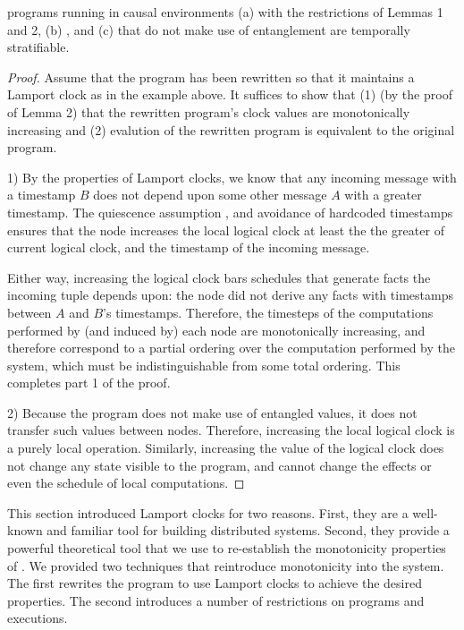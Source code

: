 \begin{lemma}
\lang programs running in causal environments (a) with the restrictions of
Lemmas 1 and 2, (b) , and (c) that do not make use of entanglement are temporally
stratifiable.
\begin{proof}
Assume that the program has been rewritten
so that it maintains a Lamport clock as in the example above.  It
suffices to show that (1) (by the proof of Lemma 2) that the rewritten
program's clock values are monotonically increasing and (2) evalution
of the rewritten program is equivalent to the original program.

1) By the properties of Lamport clocks, we know that any incoming
message with a timestamp $B$ does not depend upon some other message
$A$ with a greater timestamp.  The quiescence assumption , and avoidance of hardcoded timestamps ensures
that the node increases the local logical clock at least the the
greater of current logical clock, and the timestamp of the incoming
message.

Either way, increasing the logical clock bars schedules that generate
facts the incoming tuple depends upon: the node did not derive any
facts with timestamps between $A$ and $B$'s timestamps.  Therefore,
the timesteps of the computations performed by (and induced by) each
node are monotonically increasing, and therefore correspond to a
partial ordering over the computation performed by the system, which
must be indistinguishable from some total ordering.  This completes
part 1 of the proof.

2) Because the program does not make use of entangled values,
it does not transfer such values between nodes.  Therefore, increasing
the local logical clock is a purely local operation.  Similarly,
increasing the value of the logical clock does not change any state
visible to the program, and cannot change the effects or even the
schedule of local computations.
\end{proof}
\end{lemma}

This section introduced Lamport clocks for two reasons.  First, they
are a well-known and familiar tool for building distributed systems.
Second, they provide a powerful theoretical tool that we use to
re-establish the monotonicity properties of \slang.  We provided two
techniques that reintroduce monotonicity into the system.  The first
rewrites the program to use Lamport clocks to achieve the desired
properties.  The second introduces a number of restrictions on \lang
programs and executions.

